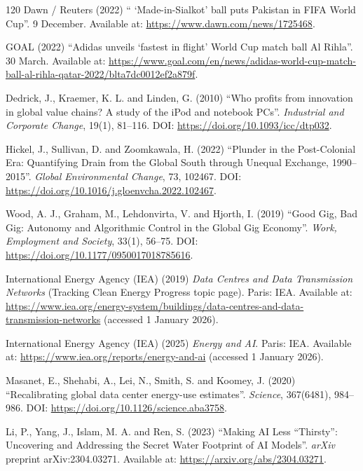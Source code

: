 \begin{singlespace}
\begin{thebibliography}{120}
Dawn / Reuters (2022)
`` `Made-in-Sialkot' ball puts Pakistan in FIFA World Cup''.
9 December.
Available at: \url{https://www.dawn.com/news/1725468}.

GOAL (2022)
``Adidas unveils `fastest in flight' World Cup match ball Al Rihla''.
30 March.
Available at: \url{https://www.goal.com/en/news/adidas-world-cup-match-ball-al-rihla-qatar-2022/blta7dc0012ef2a879f}.

Dedrick, J., Kraemer, K. L. and Linden, G. (2010) ``Who profits from innovation in global value chains? A study of the iPod and notebook PCs''.
\emph{Industrial and Corporate Change}, 19(1), 81--116.
DOI: \url{https://doi.org/10.1093/icc/dtp032}.

Hickel, J., Sullivan, D. and Zoomkawala, H. (2022) ``Plunder in the Post-Colonial Era: Quantifying Drain from the Global South through Unequal Exchange, 1990--2015''.
\emph{Global Environmental Change}, 73, 102467.
DOI: \url{https://doi.org/10.1016/j.gloenvcha.2022.102467}.

Wood, A. J., Graham, M., Lehdonvirta, V. and Hjorth, I. (2019) ``Good Gig, Bad Gig: Autonomy and Algorithmic Control in the Global Gig Economy''.
\emph{Work, Employment and Society}, 33(1), 56--75.
DOI: \url{https://doi.org/10.1177/0950017018785616}.

International Energy Agency (IEA) (2019) \emph{Data Centres and Data Transmission Networks} (Tracking Clean Energy Progress topic page).
Paris: IEA. Available at: \url{https://www.iea.org/energy-system/buildings/data-centres-and-data-transmission-networks} (accessed 1 January 2026).

International Energy Agency (IEA) (2025) \emph{Energy and AI}.
Paris: IEA. Available at: \url{https://www.iea.org/reports/energy-and-ai} (accessed 1 January 2026).

Masanet, E., Shehabi, A., Lei, N., Smith, S. and Koomey, J. (2020)
``Recalibrating global data center energy-use estimates''.
\emph{Science}, 367(6481), 984--986.
DOI: \url{https://doi.org/10.1126/science.aba3758}.

Li, P., Yang, J., Islam, M. A. and Ren, S. (2023)
``Making AI Less ``Thirsty'': Uncovering and Addressing the Secret Water Footprint of AI Models''.
\emph{arXiv} preprint arXiv:2304.03271.
Available at: \url{https://arxiv.org/abs/2304.03271}.


\end{thebibliography}
\end{singlespace}

